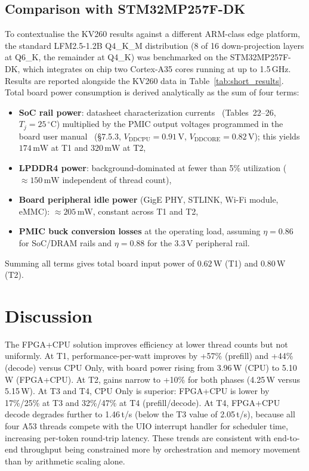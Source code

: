\documentclass[manuscript,]{acmart} %
\begin{document}
\subsection{Comparison with STM32MP257F-DK}\label{subsec:stm32comparison}
To contextualise the KV260 results against a different ARM-class edge platform,
the standard LFM2.5-1.2B Q4\_K\_M distribution (8 of 16 down-projection layers at Q6\_K, the remainder at Q4\_K) was benchmarked on the STM32MP257F-DK, which integrates on chip two Cortex-A35 cores running at up to 1.5\,GHz.
Results are reported alongside the KV260 data in Table~\ref{tab:short_results}.
Total board power consumption is derived analytically as the sum of four terms:
\begin{itemize}[label=(\roman*)]
    \item \textbf{SoC rail power}: datasheet characterization currents~\cite{ds14284} (Tables~22--26, $T_j = 25\,^\circ\text{C}$) multiplied by the PMIC output voltages programmed in the board user manual~\cite{um3385} (\S7.5.3, $V_{\text{DDCPU}} = 0.91\,\text{V}$, $V_{\text{DDCORE}} = 0.82\,\text{V}$); this yields $174\,\text{mW}$ at T1 and $320\,\text{mW}$ at T2,
    \item \textbf{LPDDR4 power}: background-dominated at fewer than 5\% utilization ($\approx 150\,\text{mW}$ independent of thread count),
    \item \textbf{Board peripheral idle power} (GigE PHY, STLINK, Wi-Fi module, eMMC): $\approx 205\,\text{mW}$, constant across T1 and T2,
    \item \textbf{PMIC buck conversion losses} at the operating load, assuming $\eta = 0.86$ for SoC/DRAM rails and $\eta = 0.88$ for the $3.3\,\text{V}$ peripheral rail.
\end{itemize}
Summing all terms gives total board input power of $0.62\,\text{W}$ (T1) and $0.80\,\text{W}$ (T2).


\section{Discussion} \label{sec:discussion}
The FPGA+CPU solution improves efficiency at lower thread counts but not uniformly.
At T1, performance-per-watt improves by +57\% (prefill) and +44\% (decode) versus CPU Only,
with board power rising from 3.96\,W (CPU) to 5.10\,W (FPGA+CPU).
At T2, gains narrow to +10\% for both phases (4.25\,W versus 5.15\,W).
At T3 and T4, CPU Only is superior: FPGA+CPU is lower by 17\%/25\% at T3 and 32\%/47\% at T4 (prefill/decode).
At T4, FPGA+CPU decode degrades further to 1.46\,t/s (below the T3 value of 2.05\,t/s), because all four A53 threads compete with the UIO interrupt handler for scheduler time, increasing per-token round-trip latency.
These trends are consistent with end-to-end throughput being constrained more by orchestration and memory movement than by arithmetic scaling alone.
\end{document}
